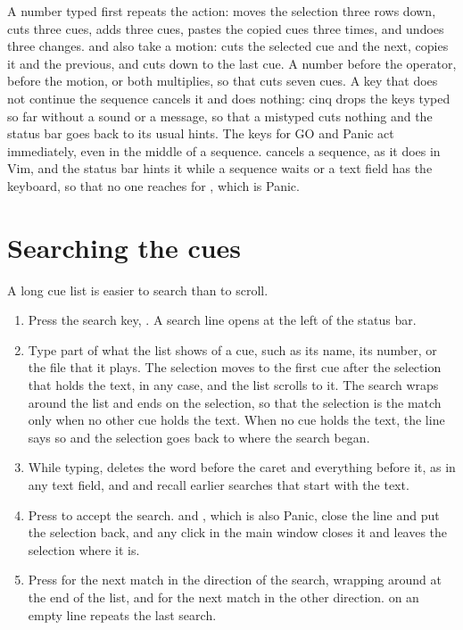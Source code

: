 A number typed first repeats the action:  moves the selection three
rows down, \key{3dd} cuts three cues,  adds three cues, 
pastes the copied cues three times, and  undoes three changes.
 and  also take a motion:  cuts the selected cue and
the next,  copies it and the previous, and  cuts down to the
last cue.  A number before the operator, before the motion, or both
multiplies, so that  cuts seven cues.  A key that does not
continue the sequence cancels it and does nothing: cinq drops the keys typed
so far without a sound or a message, so that a mistyped  cuts nothing
and the status bar goes back to its usual hints.  The keys for GO
and Panic act immediately, even in the middle of a sequence.  
cancels a sequence, as it does in Vim, and the status bar
hints it while a sequence waits or a text field has the keyboard, so that no one
reaches for , which is Panic.

\section{Searching the cues}

A long cue list is easier to search than to scroll.

\begin{enumerate}
\item Press the search key, \key{/}.  A search line opens at the left of
  the status bar.
\item Type part of what the list shows of a cue, such as its name, its number,
  or the file that it plays.  The selection moves to the first
  cue after the selection that holds the text, in any case, and the list
  scrolls to it.  The search wraps around the list and ends on the selection,
  so that the selection is the match only when no other cue holds the text.
  When no cue holds the text, the line says so and the selection goes back to
  where the search began.
\item While typing,  deletes the word before the caret and
   everything before it, as in any text field, and
   and  recall earlier searches that start with
  the text.
\item Press  to accept the search.   and
  , which is also Panic, close the line and put the
  selection back, and any click in the main window closes it and leaves the
  selection where it is.
\item Press  for the next match in the direction of the search, wrapping
  around at the end of the list, and  for the next match in the other
  direction.   on an empty line repeats the last search.
\end{enumerate}

